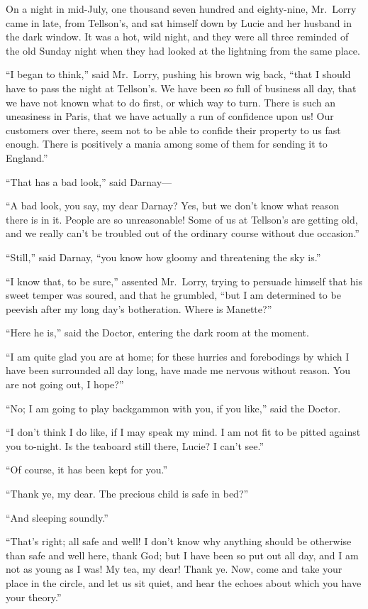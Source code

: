 On a night in mid-July, one thousand seven hundred and eighty-nine,
Mr.\ Lorry came in late, from Tellson's, and sat himself down by Lucie
and her husband in the dark window.  It was a hot, wild night, and
they were all three reminded of the old Sunday night when they had
looked at the lightning from the same place.

``I began to think,'' said Mr.\ Lorry, pushing his brown wig back, ``that
I should have to pass the night at Tellson's.  We have been so full of
business all day, that we have not known what to do first, or which
way to turn.  There is such an uneasiness in Paris, that we have
actually a run of confidence upon us!  Our customers over there, seem
not to be able to confide their property to us fast enough.  There is
positively a mania among some of them for sending it to England.''

``That has a bad look,'' said Darnay---%

``A bad look, you say, my dear Darnay?  Yes, but we don't know what
reason there is in it.  People are so unreasonable!  Some of us at
Tellson's are getting old, and we really can't be troubled out of
the ordinary course without due occasion.''

``Still,'' said Darnay, ``you know how gloomy and threatening the sky is.''

``I know that, to be sure,'' assented Mr.\ Lorry, trying to persuade
himself that his sweet temper was soured, and that he grumbled,
``but I am determined to be peevish after my long day's botheration.
Where is Manette?''

``Here he is,'' said the Doctor, entering the dark room at the moment.

``I am quite glad you are at home; for these hurries and forebodings by
which I have been surrounded all day long, have made me nervous
without reason.  You are not going out, I hope?''

``No; I am going to play backgammon with you, if you like,''
said the Doctor.

``I don't think I do like, if I may speak my mind.  I am not fit to
be pitted against you to-night.  Is the teaboard still there, Lucie?
I can't see.''

``Of course, it has been kept for you.''

``Thank ye, my dear.  The precious child is safe in bed?''

``And sleeping soundly.''

``That's right; all safe and well!  I don't know why anything should
be otherwise than safe and well here, thank God; but I have been so
put out all day, and I am not as young as I was!  My tea, my dear!
Thank ye.  Now, come and take your place in the circle, and let us
sit quiet, and hear the echoes about which you have your theory.''

